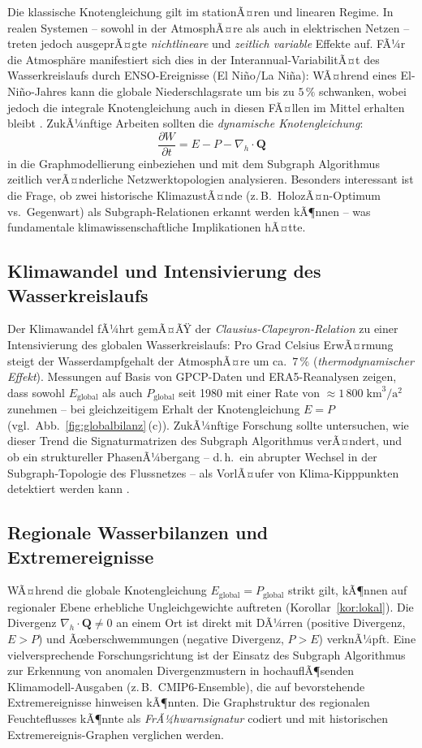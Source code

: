 ﻿\documentclass[a4paper,12pt]{article}
\theoremstyle{definition}
\begin{document}
Die klassische Knotengleichung gilt im stationÃ¤ren und linearen Regime.
In realen Systemen -- sowohl in der AtmosphÃ¤re als auch in elektrischen
Netzen -- treten jedoch ausgeprÃ¤gte \emph{nichtlineare} und
\emph{zeitlich variable} Effekte auf. FÃ¼r die Atmosph\"{a}re manifestiert
sich dies in der Interannual-VariabilitÃ¤t des Wasserkreislaufs durch
ENSO-Ereignisse (El Ni\~{n}o/La Ni\~{n}a): WÃ¤hrend eines El-Ni\~{n}o-Jahres
kann die globale Niederschlagsrate um bis zu $5\,\%$ schwanken, wobei
jedoch die integrale Knotengleichung auch in diesen FÃ¤llen im Mittel
erhalten bleibt \cite{adler2018}. ZukÃ¼nftige Arbeiten sollten die
\emph{dynamische Knotengleichung}:
\[
  \frac{\partial W}{\partial t} = E - P - \nabla_h \cdot \mathbf{Q}
\]
in die Graphmodellierung einbeziehen und mit dem Subgraph Algorithmus
zeitlich verÃ¤nderliche Netzwerktopologien analysieren. Besonders interessant
ist die Frage, ob zwei historische KlimazustÃ¤nde (z.\,B.\ HolozÃ¤n-Optimum
vs.\ Gegenwart) als Subgraph-Relationen erkannt werden kÃ¶nnen -- was
fundamentale klimawissenschaftliche Implikationen hÃ¤tte.

\subsection{Klimawandel und Intensivierung des Wasserkreislaufs}

Der Klimawandel fÃ¼hrt gemÃ¤ÃŸ der \emph{Clausius-Clapeyron-Relation}
zu einer Intensivierung des globalen Wasserkreislaufs: Pro Grad Celsius
ErwÃ¤rmung steigt der Wasserdampfgehalt der AtmosphÃ¤re um ca.\ $7\,\%$
(\textit{thermodynamischer Effekt}). Messungen auf Basis von GPCP-Daten
und ERA5-Reanalysen zeigen, dass sowohl $E_\mathrm{global}$ als auch
$P_\mathrm{global}$ seit 1980 mit einer Rate von
$\approx 1\,800\;\text{km}^3/\text{a}^2$ zunehmen -- bei gleichzeitigem
Erhalt der Knotengleichung $E = P$ (vgl.\ Abb.~\ref{fig:globalbilanz}\,(c)).
ZukÃ¼nftige Forschung sollte untersuchen, wie dieser Trend die
Signaturmatrizen des Subgraph Algorithmus verÃ¤ndert, und ob ein
struktureller PhasenÃ¼bergang -- d.\,h.\ ein abrupter Wechsel in der
Subgraph-Topologie des Flussnetzes -- als VorlÃ¤ufer von Klima-Kipppunkten
detektiert werden kann \cite{lenton2008}.

\subsection{Regionale Wasserbilanzen und Extremereignisse}

WÃ¤hrend die globale Knotengleichung $E_\mathrm{global} = P_\mathrm{global}$
strikt gilt, kÃ¶nnen auf regionaler Ebene erhebliche Ungleichgewichte
auftreten (Korollar~\ref{kor:lokal}). Die Divergenz $\nabla_h \cdot \mathbf{Q}
\neq 0$ an einem Ort ist direkt mit DÃ¼rren (positive Divergenz, $E > P$)
und Ãœberschwemmungen (negative Divergenz, $P > E$) verknÃ¼pft. Eine
vielversprechende Forschungsrichtung ist der Einsatz des Subgraph Algorithmus
zur Erkennung von anomalen Divergenzmustern in hochauflÃ¶senden
Klimamodell-Ausgaben (z.\,B.\ CMIP6-Ensemble), die auf bevorstehende
Extremereignisse hinweisen kÃ¶nnten. Die Graphstruktur des regionalen
Feuchteflusses kÃ¶nnte als \emph{FrÃ¼hwarnsignatur} codiert und mit
historischen Extremereignis-Graphen verglichen werden.
\end{document}
